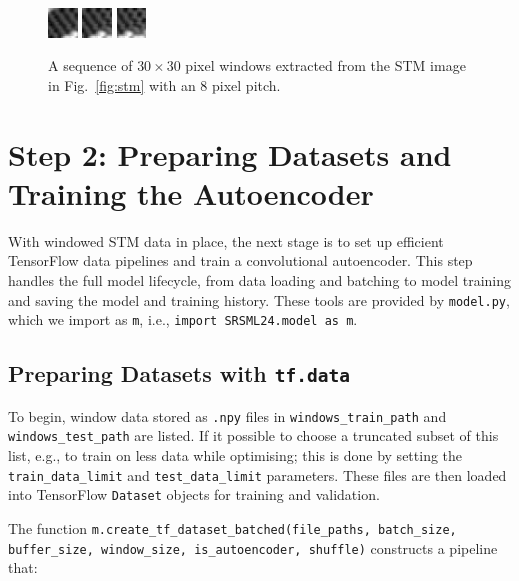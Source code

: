 \documentclass[11pt]{article}
\begin{document}
\begin{figure}[H]
\includegraphics[width=0.07\textwidth]{figs/default_2011Jan07-144939_STM-STM_Spectroscopy--1_1_BD_00040}
\hspace{0.2em}
\includegraphics[width=0.07\textwidth]{figs/default_2011Jan07-144939_STM-STM_Spectroscopy--1_1_BD_00041}
\hspace{0.2em}
\includegraphics[width=0.07\textwidth]{figs/default_2011Jan07-144939_STM-STM_Spectroscopy--1_1_BD_00042}
\caption{A sequence of $30\times30$ pixel windows extracted from the STM image in Fig.~\ref{fig:stm} with an 8 pixel pitch.}
\end{figure}

\section*{Step 2: Preparing Datasets and Training the Autoencoder}

With windowed STM data in place, the next stage is to set up efficient TensorFlow data pipelines and train a convolutional autoencoder. This step handles the full model lifecycle, from data loading and batching to model training and saving the model and training history. These tools are provided by \texttt{model.py}, which we import as \texttt{m}, i.e., \texttt{import SRSML24.model as m}.

\subsection*{Preparing Datasets with \texttt{tf.data}}

To begin, window data stored as \texttt{.npy} files in \texttt{windows\_train\_path} and \texttt{windows\_test\_path} are listed. If it possible to choose a truncated subset of this list, e.g., to train on less data while optimising; this is done by setting the \texttt{train\_data\_limit} and \texttt{test\_data\_limit} parameters. These files are then loaded into TensorFlow \texttt{Dataset} objects for training and validation.

The function \texttt{m.create\_tf\_dataset\_batched(file\_paths, batch\_size, buffer\_size, window\_size, is\_autoencoder, shuffle)} constructs a pipeline that:
\end{document}

